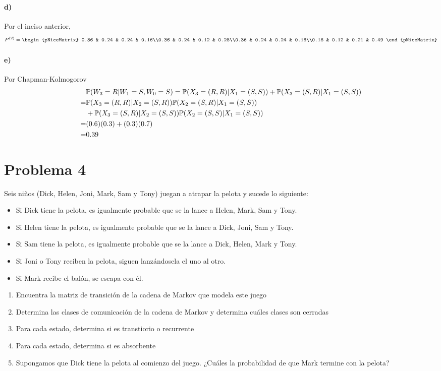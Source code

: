 \documentclass[a4paper,12pt]{article}
\begin{document}
\paragraph{d)} Por el inciso anterior,
\[P^{(2)}=\begin{pNiceMatrix}
    0.36 & 0.24 & 0.24 & 0.16\\0.36 & 0.24 & 0.12 & 0.28\\0.36 & 0.24 & 0.24 & 0.16\\0.18 & 0.12 & 0.21 & 0.49
\end{pNiceMatrix}\]
\paragraph{e)} Por Chapman-Kolmogorov
\begin{align*}
    &\mathbb{P}(W_3=R|W_1=S,W_0=S)=\mathbb{P}(X_3=(R,R)|X_1=(S,S))+ \mathbb{P}(X_3=(S,R)|X_1=(S,S))\\
    =&\mathbb{P}(X_3=(R,R)|X_2=(S,R))\mathbb{P}(X_2=(S,R)|X_1=(S,S))\\
    &+\mathbb{P}(X_3=(S,R)|X_2=(S,S))\mathbb{P}(X_2=(S,S)|X_1=(S,S))\\
    =&(0.6)(0.3)+(0.3)(0.7)\\
    =&0.39
\end{align*}
\section{Problema 4}
Seis niños (Dick, Helen, Joni, Mark,
Sam y Tony) juegan a atrapar la pelota y sucede lo siguiente:
\begin{itemize}
    \item Si Dick tiene la pelota, es igualmente probable que se la lance a Helen, Mark, Sam y Tony.
    \item Si Helen tiene la pelota, es igualmente probable que se la lance a Dick, Joni, Sam y Tony.
    \item Si Sam tiene la pelota, es igualmente probable que se la lance a Dick, Helen, Mark y Tony.
    \item Si Joni o Tony reciben la pelota, siguen lanzándosela el uno al otro.
    \item Si Mark recibe el balón, se escapa con él.
\end{itemize}
\begin{enumerate}
    \item Encuentra la matriz de transición de la cadena de Markov que modela este juego
    \item Determina las clases de comunicación de la cadena de Markov y determina cuáles clases son cerradas
    \item Para cada estado, determina si es transtiorio o recurrente
    \item Para cada estado, determina si es absorbente
    \item Supongamos que Dick tiene la pelota al comienzo del juego. ¿Cuáles la probabilidad de que Mark termine con la pelota?
\end{enumerate}
\end{document}
